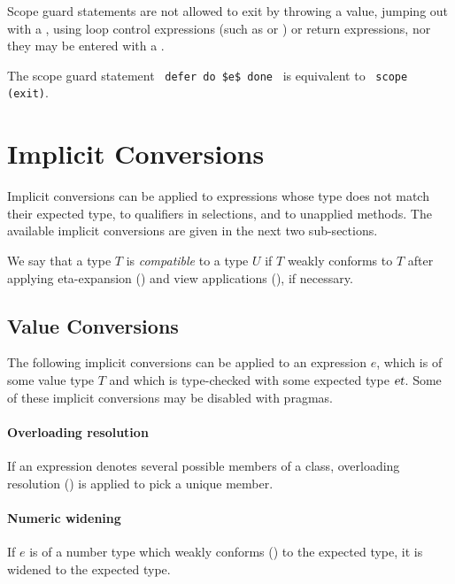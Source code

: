 Scope guard statements are not allowed to exit by throwing a value, jumping out with a , using loop control expressions (such as  or ) or return expressions, nor they may be entered with a .

The scope guard statement ~\lstinline!defer do $e$ done!~ is equivalent to ~\lstinline!scope (exit)!.





\section{Implicit Conversions}
\label{sec:implicit-conversions}

Implicit conversions can be applied to expressions whose type does not match their expected type, to qualifiers in selections, and to unapplied methods. The available implicit conversions are given in the next two sub-sections.

We say that a type $T$ is {\em compatible} to a type $U$ if $T$ weakly conforms to $T$ after applying eta-expansion () and view applications (), if necessary.






\subsection{Value Conversions}
\label{sec:value-conversions}

The following implicit conversions can be applied to an expression $e$, which is of some value type $T$ and which is type-checked with some expected type $\mbox{\sl et}$. Some of these implicit conversions may be disabled with pragmas.

\paragraph{Overloading resolution}
If an expression denotes several possible members of a class, overloading resolution () is applied to pick a unique member. 
\paragraph{Numeric widening}
If $e$ is of a number type which weakly conforms () to the expected type, it is widened to the expected type. 

